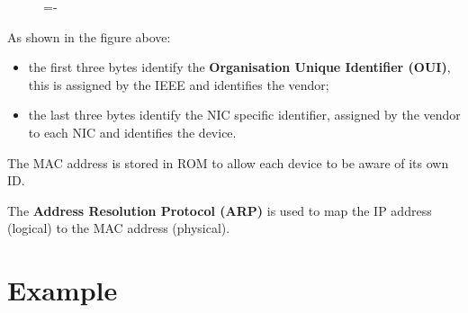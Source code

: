 \documentclass[a4paper]{systems-software}
\begin{document}
\begin{figure}[H]
	\lineskip=-\fboxrule
\end{figure}

As shown in the figure above:
\begin{itemize}
	\item the first three bytes identify the \textbf{Organisation Unique Identifier (OUI)}, this is assigned by the IEEE and identifies the vendor;
	\item the last three bytes identify the NIC specific identifier, assigned by the vendor to each NIC and identifies the device.
\end{itemize}

The MAC address is stored in ROM to allow each device to be aware of its own ID.

The \textbf{Address Resolution Protocol (ARP)} is used to map the IP address (logical) to the MAC address (physical).


\section*{Example}
\end{document}
